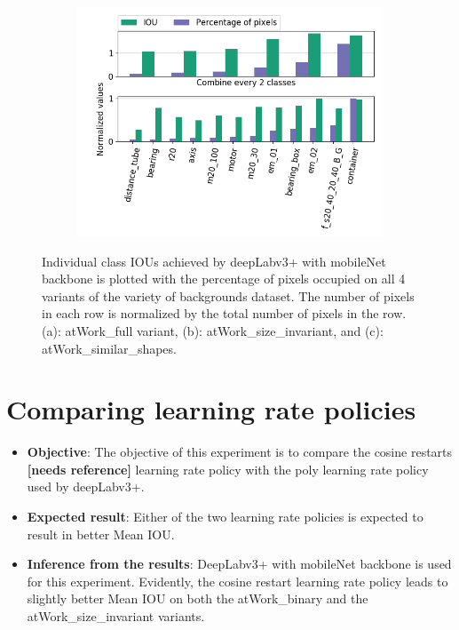 \begin{figure}[!htb]
\begin{subfigure}{.5\textwidth}
				\includegraphics[width=1\linewidth]{images/cls_iou_shape}
				\label{Fig:clsiouc}
				\caption{}
			\end{subfigure}
			\caption{Individual class IOUs achieved by deepLabv3+ with mobileNet backbone is plotted with the percentage of pixels occupied on all 4 variants of the variety of backgrounds dataset. The number of pixels in each row is normalized by the total number of pixels in the row. (a): atWork\_full variant, (b): atWork\_size\_invariant, and (c): atWork\_similar\_shapes.}
			\label{Fig:clsiou}
		\end{figure}

\section{Comparing learning rate policies}
	
	\begin{itemize}
		\item \textbf{Objective}: The objective of this experiment is to compare the cosine restarts \textbf{[needs reference]} learning rate policy with the poly learning rate policy used by deepLabv3+.
		\item \textbf{Expected result}: Either of the two learning rate policies is expected to result in better Mean IOU.
		\item \textbf{Inference from the results}: DeepLabv3+ with mobileNet backbone is used for this experiment. Evidently, the cosine restart learning rate policy leads to slightly better Mean IOU on both the atWork\_binary and the atWork\_size\_invariant variants.
	\end{itemize}
	
